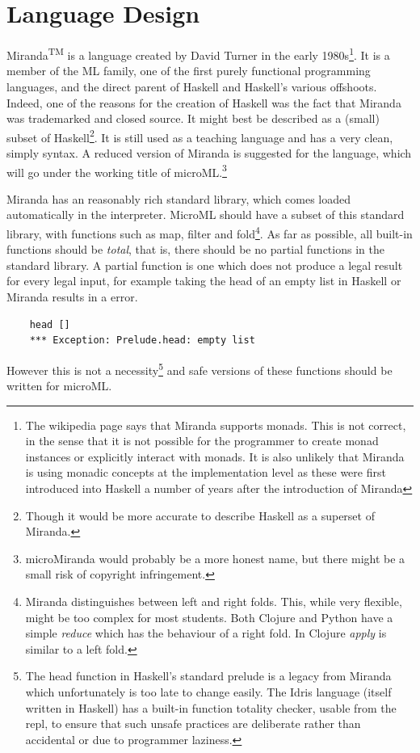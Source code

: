 \documentclass[12pt, a4paper]{report}
\begin{document}
\section{Language Design} 
\label{sec:lang}
Miranda\textsuperscript{TM} is a language
created by David Turner in the early 1980s\footnote{The wikipedia page says that Miranda supports
monads. This is not correct, in the sense that it is not possible for the programmer to create
monad instances or explicitly interact with monads. It is also unlikely that Miranda is using
monadic concepts at the implementation level as these were first introduced into Haskell a number of
years after the introduction of Miranda}. It is a member of the ML family, one of the first purely
functional programming languages, and the direct parent of Haskell and Haskell's various offshoots.
Indeed, one of the reasons for the creation of Haskell was the fact that Miranda was trademarked and
closed source. It might best be described as a (small) subset of Haskell\footnote{Though it would
be more accurate to describe Haskell as a superset of Miranda.}. It is still used as a teaching
language and has a very clean, simply syntax. A reduced version of Miranda is suggested for 
the language, which will go under the working title of microML.\footnote{microMiranda would probably be
a more honest name, but there might be a small risk of copyright infringement.}

Miranda has an reasonably rich standard library, which comes loaded automatically in the
interpreter. MicroML should have a subset of this standard library, with functions such as
map, filter and fold\footnote{Miranda distinguishes between left and right folds. This, while
very flexible, might be too complex for most students. Both Clojure and Python have a simple
\textit{reduce} which has the behaviour of a right fold. In Clojure \textit{apply} is similar to
a left fold.}. As far as possible, all built-in functions should be \textit{total}, that is, there
should be no partial functions in the standard library. A partial function is one which does not
produce a legal result for every legal input, for example taking the head of an empty list in
Haskell or Miranda results in a error.

\begin{verbatim}
    head []
    *** Exception: Prelude.head: empty list
\end{verbatim} 

However this is not a necessity\footnote{The head function in Haskell's standard prelude is a legacy
from Miranda which unfortunately is too late to change easily. The Idris language (itself written in
Haskell) has a built-in function totality checker, usable from the repl, to ensure that such unsafe
practices are deliberate rather than accidental or due to programmer laziness.} and safe versions of
these functions should be written for microML.
\end{document}
